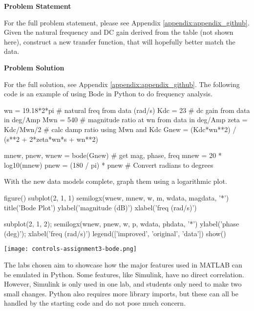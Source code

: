 \begin{tcolorbox}[breakable, enhanced jigsaw, title=ME 570: Assignment \ref{control_assignment_3}, 
    colframe=ksu-purple, colback=ksu-gray]

    \textbf{Problem Statement}
    \parindent15pt

    For the full problem statement, please see Appendix \ref{appendix:appendix_github}. Given the 
    natural frequency and DC gain derived from the table (not shown here), construct a new transfer 
    function, that will hopefully better match the data.
    
    \tcblower
    \textbf{Problem Solution}
    \parindent15pt

    For the full solution, see Appendix \ref{appendix:appendix_github}. The following code is an
    example of using Bode in Python to do frequency analysis.

\begin{python}
wn = 19.18*2*pi # natural freq from data (rad/s)
Kdc = 23 # dc gain from data in deg/Amp
Mwn = 540 # magnitude ratio at wn from data in deg/Amp
zeta = Kdc/Mwn/2 # calc damp ratio using Mwn and Kdc
Gnew = (Kdc*wn**2) / (s**2 + 2*zeta*wn*s + wn**2)

mnew, pnew, wnew = bode(Gnew) # get mag, phase, freq
mnew = 20 * log10(mnew)
pnew = (180 / pi) * pnew # Convert radians to degrees
\end{python}

With the new data models complete, graph them using a logarithmic plot.

\begin{python}
figure()
subplot(2, 1, 1)
semilogx(wnew, mnew, w, m, wdata, magdata, '*')
title('Bode Plot')
ylabel('magnitude (dB)')
xlabel('freq (rad/s)')

subplot(2, 1, 2); 
semilogx(wnew, pnew, w, p, wdata, phdata, '*')
ylabel('phase (deg)');
xlabel('freq (rad/s)')
legend(['improved', 'original', 'data'])
show()
\end{python}

\begin{center}
    \texttt{[image: controls-assignment3-bode.png]}
\end{center}
\end{tcolorbox}

The labs chosen aim to showcase how the major features used in MATLAB can be emulated in Python. Some features, like Simulink, have
no direct correlation. However, Simulink is only used in one lab, and students only need to make two small changes. Python also
requires more library imports, but these can all be handled by the starting code and do not pose much concern.

